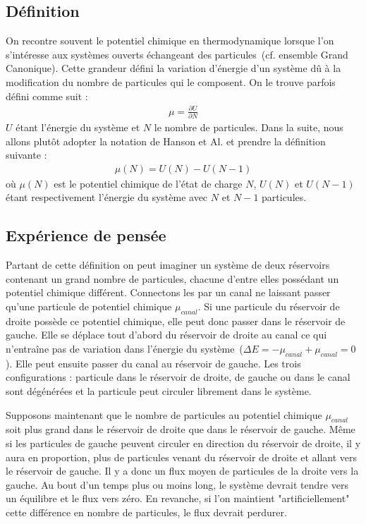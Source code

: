 \subsection{Définition}

On recontre souvent le potentiel chimique en thermodynamique lorsque l'on s'intéresse aux systèmes ouverts échangeant des particules~(cf. ensemble Grand Canonique). Cette grandeur défini la variation d'énergie d'un système d\^u à la modification du nombre de particules qui le composent. On le trouve parfois défini comme suit :
\begin{eqnarray}
\mu = \frac{\partial U}{\partial N} \nonumber
\end{eqnarray}
$U$ étant l'énergie du système et $N$ le nombre de particules. Dans la suite, nous allons plut\^ot adopter la notation de Hanson et Al. et prendre la définition suivante :
\begin{eqnarray}
\mu(N) = U(N) - U(N-1)
\end{eqnarray}
où $\mu(N)$ est le potentiel chimique de l'état de charge $N$, $U(N)$ et $U(N-1)$ étant respectivement l'énergie du système avec $N$ et $N-1$ particules.

\subsection{Expérience de pensée}

Partant de cette définition on peut imaginer un système de deux réservoirs contenant un grand nombre de particules, chacune d'entre elles possédant un potentiel chimique différent. Connectons les par un canal ne laissant passer qu'une particule de potentiel chimique $\mu_{canal}$. Si une particule du réservoir de droite possède ce potentiel chimique, elle peut donc passer dans le réservoir de gauche. Elle se déplace tout d'abord du réservoir de droite au canal ce qui n'entra\^ine pas de variation dans l'énergie du système~($\Delta E = -\mu_{canal} + \mu_{canal} = 0$). Elle peut ensuite passer du canal au réservoir de gauche. Les trois configurations : particule dans le réservoir de droite, de gauche ou dans le canal sont dégénérées et la particule peut circuler librement dans le système.

Supposons maintenant que le nombre de particules au potentiel chimique $\mu_{canal}$ soit plus grand dans le réservoir de droite que dans le réservoir de gauche. M\^eme si les particules de gauche peuvent circuler en direction du réservoir de droite, il y aura en proportion, plus de particules venant du réservoir de droite et allant vers le réservoir de gauche. Il y a donc un flux moyen de particules de la droite vers la gauche. Au bout d'un temps plus ou moins long, le système devrait tendre vers un équilibre et le flux vers zéro. En revanche, si l'on maintient "artificiellement" cette différence en nombre de particules, le flux devrait perdurer.

